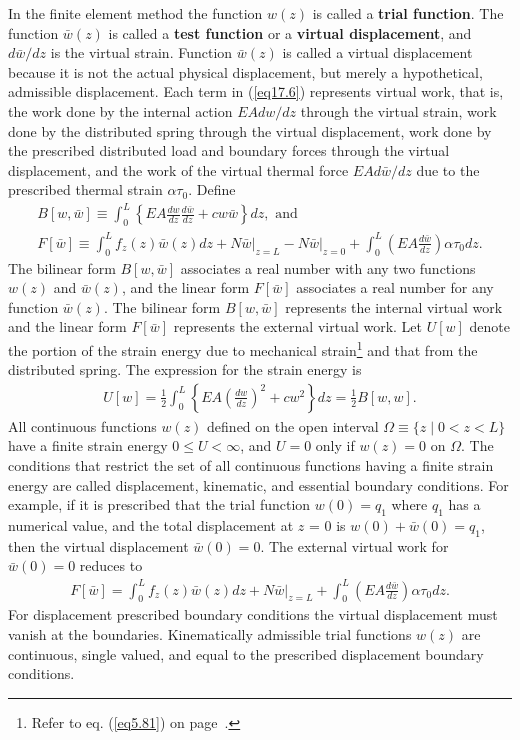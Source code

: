 \documentclass{AeroStructure-ERJohnson}
\begin{document}
In the finite element method the function $w(z)$ is called a \textbf{trial function}. The function $\bar{w}(z)$ is called a \textbf{test function} or a \textbf{virtual displacement}, and $d \bar{w}/d z$ is the virtual strain. Function $\bar{w}(z)$ is called a virtual displacement because it is not the actual physical displacement, but merely a hypothetical, admissible displacement. Each term in (\ref{eq17.6}) represents virtual work, that is, the work done by the internal action $E A d w/ d z$ through the virtual strain, work done by the distributed spring through the virtual displacement, work done by the prescribed distributed load and boundary forces through the virtual displacement, and the work of the virtual thermal force $E A d \bar{w}/d z$ due to the prescribed thermal strain $\alpha \tau_{0}$. Define
\begin{gather}
B[w, \bar{w}] \equiv \int_{0}^{L}\left\{E A \frac{d w}{d z} \frac{d \bar{w}}{d z}+c w \bar{w}\right\} dz, \textrm{ and}\label{eq17.7}\\
F[\bar{w}]\equiv \int_{0}^{L} f_{z}(z) \bar{w}(z) d z+\left.N \bar{w}\right|_{z=L}-\left.N \bar{w}\right|_{z=0}+\int_{0}^{L}\left(E A \frac{d \bar{w}}{d z}\right) \alpha \tau_{0} d z. \label{eq17.8}
\end{gather}
The bilinear form $B[w, \bar{w}]$ associates a real number with any two functions $w(z)$ and $\bar{w}(z)$, and the linear form $F[\bar{w}]$ associates a real number for any function $\bar{w}(z)$. The bilinear form $B[w, \bar{w}]$ represents the internal virtual work and the linear form $F[\bar{w}]$ represents the external virtual work. Let $U[w]$ denote the portion of the strain energy due to mechanical strain\footnote{Refer to eq. (\ref{eq5.81}) on page~\pageref{eq5.81}.} and that from the distributed spring. The expression for the strain energy is
\begin{align}\label{eq17.9}
U[w]=\frac{1}{2} \int_{0}^{L}\left\{E A\left(\frac{d w}{d z}\right)^{2}+c w^{2}\right\} d z=\frac{1}{2} B[w, w].
\end{align}
All continuous functions $w(z)$ defined on the open interval $\Omega \equiv\{z \mid 0<z<L\}$ have a finite strain energy $0 \leq U<\infty$, and $U=0$ only if $w(z)=0$ on $\Omega$. The conditions that restrict the set of all continuous functions having a finite strain energy are called displacement, kinematic, and essential boundary conditions. For example, if it is prescribed that the trial function $w(0)=q_{1}$ where $q_{1}$ has a numerical value, and the total displacement at $z$ = 0 is $w(0)+\bar{w}(0)=q_{1}$, then the virtual displacement $\bar{w}(0)=0$. The external virtual work for $\bar{w}(0)=0$ reduces to
\begin{align}\label{eq17.10}
F[\bar{w}]=\int_{0}^{L} f_{z}(z) \bar{w}(z) d z+\left.N \bar{w}\right|_{z=L}+\int_{0}^{L}\left(E A \frac{d \bar{w}}{d z}\right) \alpha \tau_{0} d z.
\end{align}
For displacement prescribed boundary conditions the virtual displacement must vanish at the boundaries. Kinematically admissible trial functions $w(z)$ are continuous, single valued, and equal to the prescribed displacement boundary conditions.
\end{document}
